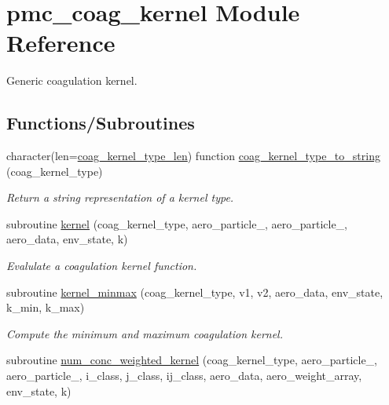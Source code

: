 \hypertarget{namespacepmc__coag__kernel}{}\section{pmc\+\_\+coag\+\_\+kernel Module Reference}
\label{namespacepmc__coag__kernel}


Generic coagulation kernel.  


\subsection*{Functions/\+Subroutines}
\begin{DoxyCompactItemize}
\item 
character(len=\mbox{\hyperlink{namespacepmc__coag__kernel_a5b9c2196146dafb206c5442d2c928559}{coag\+\_\+kernel\+\_\+type\+\_\+len}}) function \mbox{\hyperlink{namespacepmc__coag__kernel_a936dec49a171f5c431e47fa7c297409b}{coag\+\_\+kernel\+\_\+type\+\_\+to\+\_\+string}} (coag\+\_\+kernel\+\_\+type)
\begin{DoxyCompactList}\small\item\em Return a string representation of a kernel type. \end{DoxyCompactList}\item 
subroutine \mbox{\hyperlink{namespacepmc__coag__kernel_aaecec4cf362a3631e2b30f382c62b343}{kernel}} (coag\+\_\+kernel\+\_\+type, aero\+\_\+particle\+\_, aero\+\_\+particle\+\_, aero\+\_\+data, env\+\_\+state, k)
\begin{DoxyCompactList}\small\item\em Evalulate a coagulation kernel function. \end{DoxyCompactList}\item 
subroutine \mbox{\hyperlink{namespacepmc__coag__kernel_a5c6cf663a5f3f664e52ed5b979fb9fd3}{kernel\+\_\+minmax}} (coag\+\_\+kernel\+\_\+type, v1, v2, aero\+\_\+data, env\+\_\+state, k\+\_\+min, k\+\_\+max)
\begin{DoxyCompactList}\small\item\em Compute the minimum and maximum coagulation kernel. \end{DoxyCompactList}\item 
subroutine \mbox{\hyperlink{namespacepmc__coag__kernel_a346752606a43c3b5348ff3f47a4e0d17}{num\+\_\+conc\+\_\+weighted\+\_\+kernel}} (coag\+\_\+kernel\+\_\+type, aero\+\_\+particle\+\_, aero\+\_\+particle\+\_, i\+\_\+class, j\+\_\+class, ij\+\_\+class, aero\+\_\+data, aero\+\_\+weight\+\_\+array, env\+\_\+state, k)

\end{DoxyCompactItemize}
